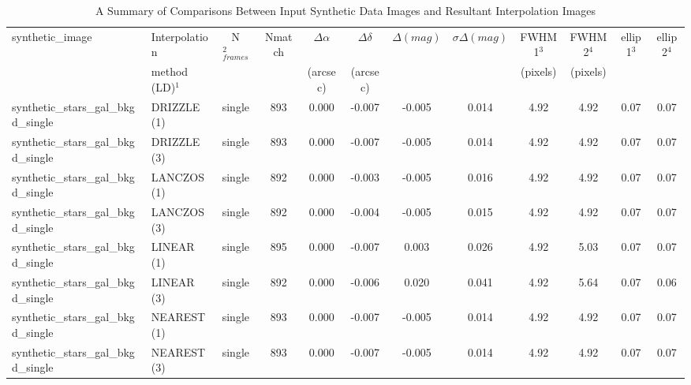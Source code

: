 \begin{table}

\caption{A Summary of Comparisons Between Input Synthetic Data Images and Resultant Interpolation Images}
\footnotesize
\begin{center}
\begin{tabular}{|l|l|c|c|c|c|c|c|c|c|c|c|}                      
\toprule
synthetic\_image         				     & Interpolation	 & N$_{frames}^2$   & Nmatch & $\Delta\alpha$  & $\Delta\delta$ &  $\Delta(mag)$ & $\sigma\Delta(mag)$ & FWHM1$^3$  & FWHM2$^4$  & ellip1$^3$  & ellip2$^4$  \\
                                     & method (LD)$^1$ &                         &               & (arcsec)            & (arcsec)          &                          &                                   & (pixels)    & (pixels)   &            & \\
\midrule
synthetic\_stars\_gal\_bkgd\_single                 & DRIZZLE (1)        & single   	& 893 	& 0.000       & -0.007  	& -0.005 & 0.014          & 4.92  & 4.92  		& 0.07  & 0.07  \\
synthetic\_stars\_gal\_bkgd\_single 	   	       & DRIZZLE (3)        & single  	& 893 	& 0.000       & -0.007  	& -0.005 & 0.014 	   & 4.92  & 4.92  		& 0.07  & 0.07  \\
synthetic\_stars\_gal\_bkgd\_single 	               & LANCZOS (1)      & single  	& 892 	& 0.000       & -0.003  	& -0.005 & 0.016          & 4.92  & 4.92  		& 0.07  & 0.07    \\
synthetic\_stars\_gal\_bkgd\_single 	   	      & LANCZOS (3)      & single  	& 892 	& 0.000       & -0.004  	& -0.005 & 0.015          & 4.92  & 4.92 		& 0.07  & 0.07    \\
synthetic\_stars\_gal\_bkgd\_single 	              & LINEAR (1)          & single    	& 895 	& 0.000       & -0.007  	&  0.003 & 0.026          & 4.92  & 5.03  		& 0.07  & 0.07    \\
synthetic\_stars\_gal\_bkgd\_single 	              & LINEAR (3)          & single    	& 892 	& 0.000       & -0.006  	&  0.020 & 0.041          & 4.92  & 5.64  		& 0.07  & 0.06    \\
synthetic\_stars\_gal\_bkgd\_single 	              & NEAREST (1)      & single   	& 893 	& 0.000       & -0.007  	& -0.005 & 0.014          & 4.92  & 4.92  		& 0.07  & 0.07    \\
synthetic\_stars\_gal\_bkgd\_single 	              & NEAREST (3)      & single   	& 893 	& 0.000       & -0.007  	& -0.005 & 0.014          & 4.92  & 4.92  		& 0.07  & 0.07    \\

\end{tabular}
\end{center}
\end{table}
